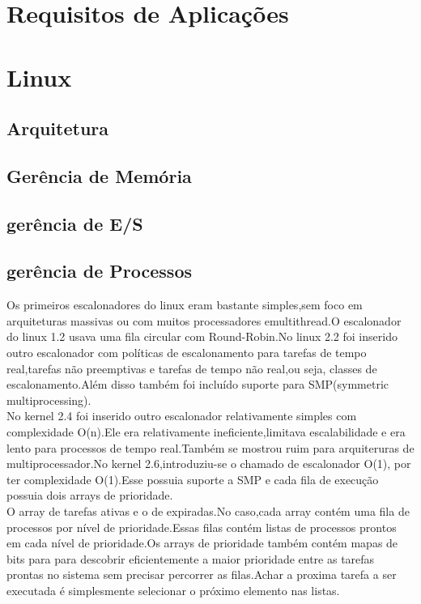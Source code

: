 \documentclass[conference]{IEEEtran}
\begin{document}
\section{Requisitos de Aplicações}\label{sec:req}

\section{Linux}\label{sec:linux}

\subsection{Arquitetura}\label{sec:LinuxArq}

\subsection{Gerência de Memória}\label{sec:LinuxMem}

\subsection{gerência de E/S}\label{sec:LinuxES}

\subsection{gerência de Processos}\label{sec:LinuxPROC}

Os primeiros escalonadores do linux eram bastante simples,sem foco em arquiteturas massivas ou com muitos processadores emultithread.O escalonador do linux 1.2 usava uma fila circular com Round-Robin.No linux 2.2 foi inserido outro escalonador com políticas de escalonamento para tarefas de tempo real,tarefas não preemptivas e tarefas de tempo não real,ou seja, classes de escalonamento.Além disso também foi incluído suporte para SMP(symmetric multiprocessing)\cite{LinuxSchedulerIBM}.\\

 No kernel 2.4 foi  inserido outro escalonador relativamente simples com complexidade O(n).Ele era relativamente ineficiente,limitava escalabilidade e era lento para processos de tempo real.Também se mostrou ruim para arquiteruras de multiprocessador.No kernel 2.6,introduziu-se o chamado de escalonador O(1), por ter complexidade O(1).Esse possuia suporte a SMP e cada fila de execução possuia dois arrays de prioridade.\\

 O array de tarefas ativas e o de expiradas.No caso,cada array contém uma fila de processos por nível de prioridade.Essas filas contém listas de processos prontos em cada nível de prioridade.Os  arrays de prioridade também contém mapas de bits para para descobrir eficientemente a maior prioridade entre as tarefas prontas no sistema sem precisar percorrer as filas.Achar a proxima tarefa a ser executada é simplesmente selecionar o próximo elemento nas listas.\\
\end{document}
